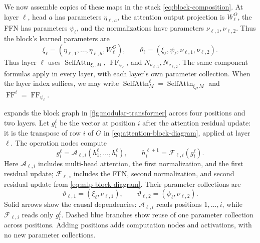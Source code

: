 \documentclass[11pt,twoside]{article}
\theoremstyle{plain}
\theoremstyle{definition}
\theoremstyle{remark}
\begin{document}
We now assemble copies of these maps in the stack
\eqref{eq:block-composition}. At layer $\ell$, head $a$ has parameters
$\eta_{\ell,a}$, the attention output projection is $W^O_\ell$, the FFN
has parameters $\psi_\ell$, and the normalizations have parameters
$\nu_{\ell,1},\nu_{\ell,2}$. Thus the block's learned parameters are
\begin{equation}
\xi_\ell=(\eta_{\ell,1},\ldots,\eta_{\ell,h},W^O_\ell),
\qquad
\theta_\ell=(\xi_\ell,\psi_\ell,\nu_{\ell,1},\nu_{\ell,2}).
\label{eq:block-parameters}
\end{equation}
Thus layer $\ell$ uses $\operatorname{SelfAttn}_{\xi_\ell,M}$,
$\operatorname{FF}_{\psi_\ell}$, and $N_{\nu_{\ell,1}},N_{\nu_{\ell,2}}$.
The same component formulas apply in every layer, with each layer's own
parameter collection. When the layer index suffices, we may write
$\operatorname{SelfAttn}^{\ell}_M=\operatorname{SelfAttn}_{\xi_\ell,M}$ and
$\operatorname{FF}^{\ell}=\operatorname{FF}_{\psi_\ell}$.

 expands the block graph in
\cref{fig:modular-transformer} across four positions and two layers.
Let $g_i^\ell$ be the vector at position $i$ after the attention residual
update: it is the transpose of row $i$ of $G$ in
\eqref{eq:attention-block-diagram}, applied at layer $\ell$. The operation
nodes compute
\[
g_i^\ell=\mathcal A_{\ell,i}(h_1^\ell,\ldots,h_i^\ell),
\qquad
h_i^{\ell+1}=\mathcal F_{\ell,i}(g_i^\ell).
\]
Here $\mathcal A_{\ell,i}$ includes multi-head attention, the first
normalization, and the first residual update; $\mathcal F_{\ell,i}$ includes
the FFN, second normalization, and second residual update from
\eqref{eq:mlp-block-diagram}. Their parameter collections are
\[
\vartheta_{\ell,1}
=(\xi_\ell,\nu_{\ell,1}),
\qquad
\vartheta_{\ell,2}=(\psi_\ell,\nu_{\ell,2}).
\]
Solid arrows show the causal dependencies: $\mathcal A_{\ell,i}$ reads
positions $1,\ldots,i$, while $\mathcal F_{\ell,i}$ reads only $g_i^\ell$.
Dashed blue branches show reuse of one parameter collection across positions.
Adding positions adds computation nodes and activations, with no new
parameter collections.
\end{document}
